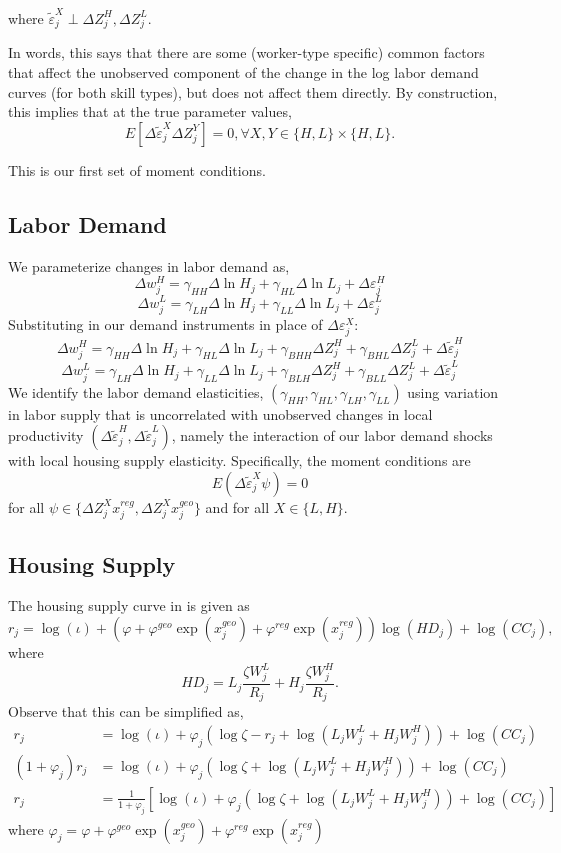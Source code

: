 \documentclass{article}
\begin{document}
 where $\tilde{\varepsilon}_{j}^X \perp \Delta Z_{j}^H, \Delta Z_{j}^L$.

 In words, this says that there are some (worker-type specific) common factors  that affect the unobserved  component of the change in the log labor demand curves (for both skill types), but does not affect them directly. By construction, this implies that at the true parameter values, $$E[\Delta \tilde\varepsilon_{j}^X \Delta Z_{j}^Y]=0, \forall X,Y \in \{H,L\} \times \{H,L\}.$$ 

 This is our first set of moment conditions. 

 \subsection{Labor Demand}

 We parameterize changes in labor demand as,
 $$\Delta w_{j}^H = \gamma_{HH} \Delta \ln H_{j} + \gamma_{HL}\Delta \ln L_{j} + \Delta \varepsilon_{j}^H$$
$$\Delta w_{j}^L = \gamma_{LH} \Delta \ln H_{j} + \gamma_{LL}\Delta \ln L_{j} + \Delta \varepsilon_{j}^L$$
Substituting in our demand instruments in place of $\Delta\varepsilon_{j}^X$:
 $$\Delta w_{j}^H = \gamma_{HH} \Delta \ln H_{j} + \gamma_{HL}\Delta \ln L_{j} + \gamma_{BHH}\Delta Z_{j}^H  + \gamma_{BHL}\Delta Z_{j}^L +\Delta \tilde{\varepsilon}_{j}^H$$
$$\Delta w_{j}^L = \gamma_{LH} \Delta \ln H_{j} + \gamma_{LL}\Delta \ln L_{j} + \gamma_{BLH}\Delta Z_{j}^H  + \gamma_{BLL}\Delta Z_{j}^L +\Delta \tilde{\varepsilon}_{j}^L$$
We identify the labor demand elasticities, $(\gamma_{HH}, \gamma_{HL}, \gamma_{LH}, \gamma_{LL})$ using variation in labor supply that is uncorrelated with unobserved changes in local productivity $(\Delta\tilde{\varepsilon}_{j}^H, \Delta\tilde{\varepsilon}_{j}^L)$, namely the interaction of our labor demand shocks with local housing supply elasticity. Specifically, the moment conditions are
$$E(\Delta\tilde{\varepsilon}_{j}^X \psi) = 0$$
for all $\psi \in \{\Delta Z_{j}^X x_j^{reg}, \Delta Z_{j}^X x_j^{geo}\}$ and for all $X\in\{L,H\}$.

\subsection{Housing Supply}

The housing supply curve in is given as 
$$
r_{j} =\log( \iota )+ (\varphi + \varphi^{geo}\exp(x_j^{geo}) + \varphi^{reg}\exp(x^{reg}_j))\log (HD_{j}) +  \log(CC_{j}),
$$
where 
$$
HD_{j} = L_{j} \frac{\zeta W^L_{j}}{R_{j}} + H_{j} \frac{\zeta W^H_{j}}{R_{j}} .
$$
Observe that this can be simplified as,
\begin{align*}
    r_{j} &=\log( \iota )+ \varphi_j\left(\log\zeta - r_j + \log(L_jW_j^L + H_jW_j^H) \right) +  \log(CC_{j}) \\
    (1+\varphi_j)r_j &=\log( \iota )+ \varphi_j\left(\log\zeta + \log(L_jW_j^L + H_jW_j^H) \right) +  \log(CC_{j}) \\
    r_j &=\frac{1}{1+\varphi_j}\left[\log( \iota )+ \varphi_j\left(\log\zeta + \log(L_jW_j^L + H_jW_j^H) \right) +  \log(CC_{j})\right]
\end{align*}
where $\varphi_j = \varphi + \varphi^{geo}\exp(x_j^{geo}) + \varphi^{reg}\exp(x^{reg}_j)$
\end{document}
